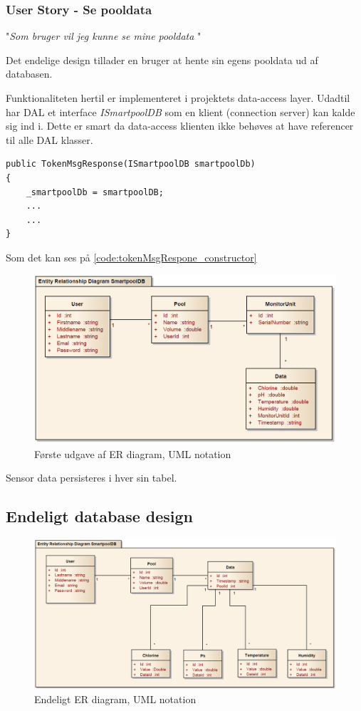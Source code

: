 \subsubsection{User Story - Se pooldata}

"\textit{Som bruger vil jeg kunne se mine pooldata }"

Det endelige design tillader en bruger at hente sin egens pooldata ud af databasen.

Funktionaliteten hertil er implementeret i projektets data-access layer. Udadtil har DAL et interface \textit{ISmartpoolDB} som en klient (connection server) kan kalde sig ind i. Dette er smart da data-access klienten ikke behøves at have referencer til alle DAL klasser.

\begin{lstlisting}[caption=TokenMsgResponse constructor,label=code:tokenMsgRespone_constructor]
public TokenMsgResponse(ISmartpoolDB smartpoolDb)
{
	_smartpoolDb = smartpoolDB;
	...
	...
}
\end{lstlisting}

Som det kan ses på \ref{code:tokenMsgRespone_constructor}



\begin{figure}
	\centering
	\includegraphics[width=\linewidth]{figs/design/databaseERD_old_uml}
	\caption{Første udgave af ER diagram, UML notation}
	\label{fig:databaseERD_old_uml}
\end{figure}

Sensor data persisteres i hver sin tabel.

\subsection{Endeligt database design}

\begin{figure}
\centering
\includegraphics[width=\linewidth]{figs/design/databaseERD_final_uml}
\caption{Endeligt ER diagram, UML notation}
\label{fig:databaseERD_final_uml}
\end{figure}




